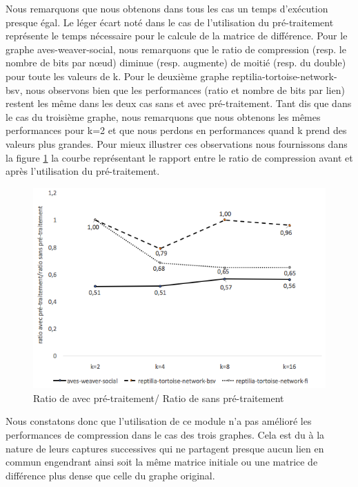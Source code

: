 Nous remarquons que nous obtenons dans tous les cas un temps d'exécution presque égal. Le léger écart noté dans le cas de l'utilisation du pré-traitement représente le temps nécessaire pour le calcule de la matrice de différence. 
Pour le graphe aves-weaver-social, nous remarquons que le ratio de compression (resp. le nombre de bits par nœud) diminue (resp. augmente) de moitié (resp. du double) pour toute les valeurs de k. Pour le deuxième graphe reptilia-tortoise-network-bsv, nous observons bien que les performances (ratio et nombre de bits par lien) restent les même dans les deux cas sans et avec pré-traitement. Tant dis que dans le cas du troisième graphe, nous remarquons que nous obtenons les mêmes performances pour k=2 et que nous perdons en performances quand  k prend des valeurs plus grandes. Pour mieux illustrer ces observations nous fournissons dans la figure \ref{perte } la courbe représentant le rapport entre le ratio de compression avant et après l'utilisation du pré-traitement. 


\begin{figure}[H]
	\centering
	\includegraphics[scale=0.5]{ressources/image/perteIk2.png}
	
	\caption{Ratio de avec pré-traitement/ Ratio de sans pré-traitement}
	\label{perte }
\end{figure}

Nous constatons donc que l'utilisation de ce module n'a pas amélioré les performances de compression dans le cas des trois graphes. Cela est du à la nature de leurs captures successives qui ne partagent presque aucun lien en commun engendrant ainsi soit la même matrice initiale ou une matrice de différence plus dense que celle du graphe original.



